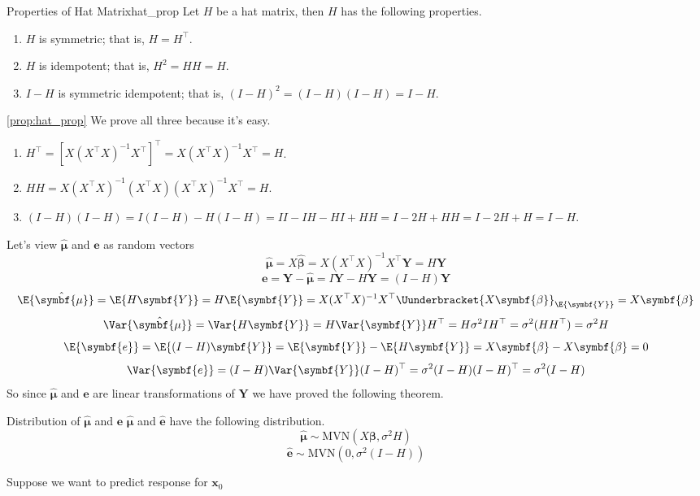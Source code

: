 \begin{Proposition}{Properties of Hat Matrix}{hat_prop}
    Let $ H $ be a hat matrix, then $ H $ has the following properties.
    \begin{enumerate}[label=(\arabic*)]
        \item $ H $ is symmetric; that is, $ H=H^\top $.
        \item $ H $ is idempotent; that is, $ H^2=HH=H $.
        \item $ I-H $ is symmetric idempotent; that is,
              $ (I-H)^2=(I-H)(I-H)=I-H $.
    \end{enumerate}
\end{Proposition}
\begin{Proof}{\ref{prop:hat_prop}}{} We prove all three because it's easy.
    \begin{enumerate}[label=(\arabic*)]
        \item $ H^\top=[X(X^\top X)^{-1}X^\top]^\top=X(X^\top X)^{-1}X^\top=H $.
        \item  $ HH=X(X^\top X)^{-1}(X^\top X)(X^\top X)^{-1}X^\top=H $.
        \item  $ (I-H)(I-H)=I(I-H)-H(I-H)=II-IH-HI+HH=I-2H+HH=I-2H+H=I-H $.
    \end{enumerate}
\end{Proof}
Let's view $ \hat{\symbf{\mu}} $ and $ \symbf{e} $
as random vectors
\[ \hat{\symbf{\mu}}=X\hat{\symbf{\beta}}=
    X(X^\top X)^{-1}X^\top \symbf{Y}=H\symbf{Y} \]
\[ \symbf{e}=\symbf{Y}-\hat{\symbf{\mu}}=I\symbf{Y}-H\symbf{Y}=
    (I-H)\symbf{Y} \]
\[ \E{\hat{\symbf{\mu}}}=\E{H\symbf{Y}}=H\E{\symbf{Y}}=
    X(X^\top X)^{-1}X^\top \Uunderbracket{X\symbf{\beta}}_{\E{\symbf{Y}}}
    =X\symbf{\beta}
\]
\[ \Var{\hat{\symbf{\mu}}}=\Var{H\symbf{Y}}=
    H\Var{\symbf{Y}}H^\top=H\sigma^2I H^\top=\sigma^2(HH^\top)=\sigma^2H \]
\[ \E{ \symbf{e}}=
    \E{(I-H)\symbf{Y}}=\E{\symbf{Y}}-\E{H\symbf{Y}}=X\symbf{\beta}-X\symbf{\beta}=0 \]
\[ \Var{\symbf{e}}=
    (I-H)\Var{\symbf{Y}}(I-H)^\top=\sigma^2(I-H)(I-H)^\top=\sigma^2(I-H) \]
So since $ \hat{\symbf{\mu}} $ and $ \symbf{e} $
are linear transformations of $ \symbf{Y} $ we have proved the following theorem.
\begin{Theorem}{Distribution of $ \hat{\symbf{\mu}} $ and $ \symbf{e} $}{}
    $ \hat{\symbf{\mu}} $ and $ \hat{\symbf{e}} $ have the following distribution.
    \[ \hat{\symbf{\mu}}\sim\text{MVN}(X\symbf{\beta},\sigma^2 H) \]
    \[ \hat{\symbf{e}}\sim\text{MVN}(0,\sigma^2(I-H)) \]
\end{Theorem}
Suppose we want to predict response for $ \symbf{x}_0 $
